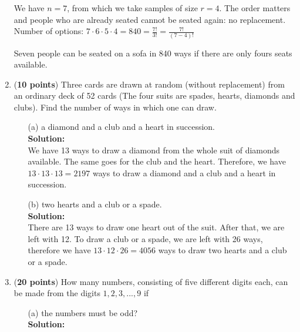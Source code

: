\documentclass[a4paper]{article}
\begin{document}
\begin{enumerate}
We have $n = 7$, from which we take samples of size $r = 4$. The order matters and people who are already seated cannot be seated again: no replacement.\\

Number of options: $7 \cdot 6 \cdot 5 \cdot 4 = 840 = \frac{7!}{3!} = \frac{7!}{(7-4)!}$


Seven people can be seated on a sofa in 840 ways if there are only fours seats available.\\



\item (\textbf{10 points}) Three cards are drawn at random (without replacement) from an ordinary deck of 52 cards (The four suits are spades, hearts, diamonds and clubs). Find the number of ways in which one can draw.



\begin{enumerate}
	\item[(a)] a diamond and a club and a heart in succession.\\
	\textbf{Solution:}\\
	
We have 13 ways to draw a diamond from the whole suit of diamonds available. The same goes for the club and the heart. Therefore, we have $13 \cdot 13 \cdot 13 = 2197$ ways to draw a diamond and a club and a heart in succession.\\
	

	
	\item[(b)] two hearts and a club or a spade.\\
	\textbf{Solution:}\\
	
	
There are 13 ways to draw one heart out of the suit. After that, we are left with 12. To draw a club or a spade, we are left with 26 ways, therefore we have $13 \cdot 12 \cdot 26 = 4056$ ways to draw two hearts and a club or a spade.\\
	
	
	
		
\end{enumerate}


\item (\textbf{20 points}) How many numbers, consisting of five different digits each, can be made from the digits $1,2,3,...,9$ if

\begin{enumerate}
	\item[(a)] the numbers must be odd?\\
	\textbf{Solution:}\\
	

\end{enumerate}
\end{enumerate}
\end{document}
